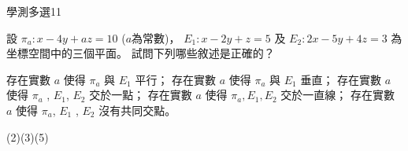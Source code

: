     \begin{QUESTION}
        \begin{ExamInfo}{92}{學測}{多選}{11}
        \end{ExamInfo}
        \begin{ExamAnsRateInfo}{24}{43}{18}{11}
        \end{ExamAnsRateInfo}
        \begin{QBODY}
            設 $\pi_a : x-4y +az=10$ ($a$為常數)， $E_1 :x-2y+z=5$ 及 $E_2  :2x-5y+4z=3$ 為坐標空間中的三個平面。
            試問下列哪些敘述是正確的？
            
            \begin{QOPS} 
                \QOP 存在實數 $a$ 使得 $\pi_a$ 與 $E_1$ 平行；
                \QOP 存在實數 $a$ 使得 $\pi_a$ 與 $E_1$ 垂直；
                \QOP 存在實數 $a$ 使得 $\pi_a$ , $E_1$, $E_2$ 交於一點； 
                \QOP 存在實數 $a$ 使得 $\pi_a, E_1, E_2 $ 交於一直線；
                \QOP 存在實數 $a$ 使得 $\pi_a$, $E_1$ , $E_2$ 沒有共同交點。\end{QOPS}
        \end{QBODY}
        \begin{QFROMS}
        \end{QFROMS}
        \begin{QTAGS}\end{QTAGS}
        \begin{QANS}
            (2)(3)(5)
        \end{QANS}
        \begin{QSOLLIST}
        \end{QSOLLIST}
        \begin{QEMPTYSPACE}
        \end{QEMPTYSPACE}
    \end{QUESTION}
